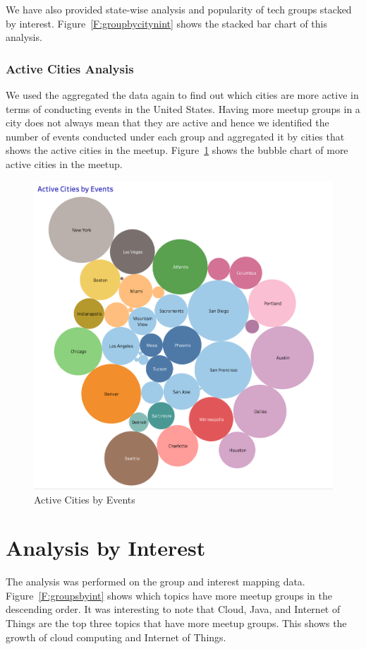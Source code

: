 \documentclass{acm_proc_article-sp}
\begin{document}
We have also provided state-wise analysis and popularity of tech groups stacked by interest.  Figure~\ref{F:groupbycitynint} shows the stacked bar chart of this analysis.

\subsubsection{Active Cities Analysis}
We used the aggregated the data again to find out which cities are more active in terms of conducting events in the United States.  Having more meetup groups in a city does not always mean that they are active and hence we identified the number of events conducted under each group and aggregated it by cities that shows the active cities in the meetup.  Figure~\ref{F:activecities} shows the bubble chart of more active cities in the meetup.
\begin{figure}[p]
  \centering
      \includegraphics[width=1.0\textwidth]{images/tableau_images/active_cities_by_event_v2.png}
  \caption{Active Cities by Events}\label{F:activecities}
\end{figure}

\section{Analysis by Interest}
The analysis was performed on the group and interest mapping data.  Figure~\ref{F:groupsbyint} shows which topics have more meetup groups in the descending order.  It was interesting to note that Cloud, Java, and Internet of Things are the top three topics that have more meetup groups.   This shows the growth of cloud computing and Internet of Things.
\end{document}
